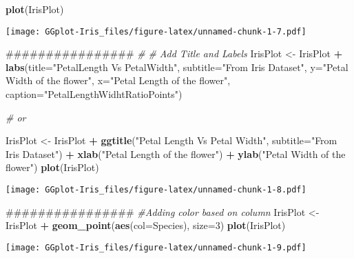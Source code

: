 \documentclass[]{article}
\newenvironment{Shaded}{\begin{snugshade}}{\end{snugshade}}
\newcommand{\KeywordTok}[1]{\textcolor[rgb]{0.13,0.29,0.53}{\textbf{#1}}}
\newcommand{\DataTypeTok}[1]{\textcolor[rgb]{0.13,0.29,0.53}{#1}}
\newcommand{\DecValTok}[1]{\textcolor[rgb]{0.00,0.00,0.81}{#1}}
\newcommand{\StringTok}[1]{\textcolor[rgb]{0.31,0.60,0.02}{#1}}
\newcommand{\CommentTok}[1]{\textcolor[rgb]{0.56,0.35,0.01}{\textit{#1}}}
\newcommand{\OperatorTok}[1]{\textcolor[rgb]{0.81,0.36,0.00}{\textbf{#1}}}
\newcommand{\NormalTok}[1]{#1}
\begin{document}
\begin{Shaded}
\begin{Highlighting}[]
\KeywordTok{plot}\NormalTok{(IrisPlot)}
\end{Highlighting}
\end{Shaded}

\texttt{[image: GGplot-Iris\_files/figure-latex/unnamed-chunk-1-7.pdf]}

\begin{Shaded}
\begin{Highlighting}[]
\NormalTok{################}
\CommentTok{#}
\CommentTok{# Add Title and Labels}
\NormalTok{IrisPlot <-}\StringTok{ }\NormalTok{IrisPlot }\OperatorTok{+}\StringTok{ }\KeywordTok{labs}\NormalTok{(}\DataTypeTok{title=}\StringTok{"PetalLength Vs PetalWidth"}\NormalTok{, }\DataTypeTok{subtitle=}\StringTok{"From Iris Dataset"}\NormalTok{, }\DataTypeTok{y=}\StringTok{"Petal Width of the flower"}\NormalTok{, }\DataTypeTok{x=}\StringTok{"Petal Length of the flower"}\NormalTok{, }\DataTypeTok{caption=}\StringTok{"PetalLengthWidhtRatioPoints"}\NormalTok{)}

\CommentTok{# or}

\NormalTok{IrisPlot <-}\StringTok{ }\NormalTok{IrisPlot }\OperatorTok{+}\StringTok{ }\KeywordTok{ggtitle}\NormalTok{(}\StringTok{"Petal Length Vs Petal Width"}\NormalTok{, }\DataTypeTok{subtitle=}\StringTok{"From Iris Dataset"}\NormalTok{) }\OperatorTok{+}\StringTok{ }\KeywordTok{xlab}\NormalTok{(}\StringTok{"Petal Length of the flower"}\NormalTok{) }\OperatorTok{+}\StringTok{ }\KeywordTok{ylab}\NormalTok{(}\StringTok{"Petal Width of the flower"}\NormalTok{)}
\KeywordTok{plot}\NormalTok{(IrisPlot)}
\end{Highlighting}
\end{Shaded}

\texttt{[image: GGplot-Iris\_files/figure-latex/unnamed-chunk-1-8.pdf]}

\begin{Shaded}
\begin{Highlighting}[]
\NormalTok{################}
\CommentTok{#Adding color based on column}
\NormalTok{IrisPlot <-}\StringTok{ }\NormalTok{IrisPlot }\OperatorTok{+}\StringTok{  }\KeywordTok{geom_point}\NormalTok{(}\KeywordTok{aes}\NormalTok{(}\DataTypeTok{col=}\NormalTok{Species), }\DataTypeTok{size=}\DecValTok{3}\NormalTok{)}
\KeywordTok{plot}\NormalTok{(IrisPlot)}
\end{Highlighting}
\end{Shaded}

\texttt{[image: GGplot-Iris\_files/figure-latex/unnamed-chunk-1-9.pdf]}
\end{document}
